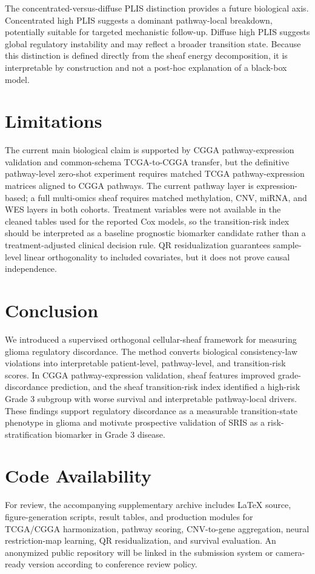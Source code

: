 \documentclass[conference]{IEEEtran}
\begin{document}
The concentrated-versus-diffuse PLIS distinction provides a future biological axis. Concentrated high PLIS suggests a dominant pathway-local breakdown, potentially suitable for targeted mechanistic follow-up. Diffuse high PLIS suggests global regulatory instability and may reflect a broader transition state. Because this distinction is defined directly from the sheaf energy decomposition, it is interpretable by construction and not a post-hoc explanation of a black-box model.

\section{Limitations}
The current main biological claim is supported by CGGA pathway-expression validation and common-schema TCGA-to-CGGA transfer, but the definitive pathway-level zero-shot experiment requires matched TCGA pathway-expression matrices aligned to CGGA pathways. The current pathway layer is expression-based; a full multi-omics sheaf requires matched methylation, CNV, miRNA, and WES layers in both cohorts. Treatment variables were not available in the cleaned tables used for the reported Cox models, so the transition-risk index should be interpreted as a baseline prognostic biomarker candidate rather than a treatment-adjusted clinical decision rule. QR residualization guarantees sample-level linear orthogonality to included covariates, but it does not prove causal independence.

\section{Conclusion}
We introduced a supervised orthogonal cellular-sheaf framework for measuring glioma regulatory discordance. The method converts biological consistency-law violations into interpretable patient-level, pathway-level, and transition-risk scores. In CGGA pathway-expression validation, sheaf features improved grade-discordance prediction, and the sheaf transition-risk index identified a high-risk Grade 3 subgroup with worse survival and interpretable pathway-local drivers. These findings support regulatory discordance as a measurable transition-state phenotype in glioma and motivate prospective validation of SRIS as a risk-stratification biomarker in Grade 3 disease.

\section*{Code Availability}
For review, the accompanying supplementary archive includes LaTeX source, figure-generation scripts, result tables, and production modules for TCGA/CGGA harmonization, pathway scoring, CNV-to-gene aggregation, neural restriction-map learning, QR residualization, and survival evaluation. An anonymized public repository will be linked in the submission system or camera-ready version according to conference review policy.
\end{document}
